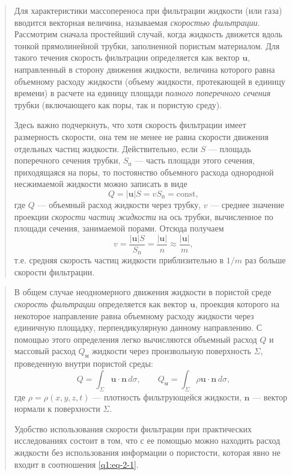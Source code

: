 \documentclass[12pt,a4paper]{article}
\newenvironment{textquote}{\begin{quote}\sloppy}{\end{quote}}
\begin{document}
\begin{textquote}
Для характеристики массопереноса при фильтрации жидкости (или газа) вводится векторная величина, называемая \textit{скоростью фильтрации}. Рассмотрим сначала простейший случай, когда жидкость движется вдоль тонкой прямолинейной трубки, заполненной пористым материалом. Для такого течения скорость фильтрации определяется как вектор $\boldsymbol{u}$, направленный в сторону движения
жидкости, величина которого равна объемному расходу жидкости (объему жидкости, протекающей в единицу времени) в расчете на единицу площади \textit{полного поперечного сечения} трубки (включающего как поры, так и пористую среду).

Здесь важно подчеркнуть, что хотя скорость фильтрации имеет размерность скорости, она тем не менее не равна скорости движения отдельных частиц жидкости. Действительно, если $S$ --- площадь поперечного сечения трубки, $S_{\text{п}}$ --- часть площади этого сечения, приходящаяся на поры, то постоянство объемного расхода однородной несжимаемой жидкости можно записать в виде
\[
Q=|\boldsymbol{u}|S=vS_{\text{п}}=\mathrm{const},
\]
где $Q$ --- объемный расход жидкости через трубку, $v$ --- среднее значение проекции \textit{скорости частиц жидкости} на ось трубки, вычисленное по площади сечения, занимаемой порами. Отсюда получаем
\[
v=\frac{|\boldsymbol{u}|S}{S_{\text{п}}}=\frac{|\boldsymbol{u}|}{n}\approx\frac{|\boldsymbol{u}|}{m},
\]
т.е. средняя скорость частиц жидкости приблизительно в $1/m$ раз больше скорости фильтрации.
\end{textquote}

\begin{textquote}
В общем случае неодномерного движения жидкости в пористой среде \textit{скорость фильтрации} определяется как вектор $\boldsymbol{u}$, проекция которого на некоторое направление равна объемному расходу жидкости через единичную площадку, перпендикулярную данному направлению. С помощью этого определения легко вычисляются объемный расход $Q$ и массовый расход $Q_{\text{м}}$ жидкости через произвольную поверхность $\Sigma$, проведенную внутри пористой среды:
\begin{equation}
Q=\int_{\Sigma}\boldsymbol{u}\cdot\boldsymbol{n}\,d\sigma,
\qquad Q_{\text{м}}=\int_{\Sigma}\rho\boldsymbol{u}\cdot\boldsymbol{n}\,d\sigma,
\tag{2.1}\label{q1:eq-2-1}
\end{equation}
где $\rho=\rho(x,y,z,t)$ --- плотность фильтрующейся жидкости, $\boldsymbol{n}$ --- вектор нормали к поверхности $\Sigma$.

Удобство использования скорости фильтрации при практических исследованиях состоит в том, что с ее помощью можно находить расход жидкости без использования информации о пористости, которая явно не входит в соотношения \eqref{q1:eq-2-1}.
\end{textquote}
\endgroup
\end{document}
